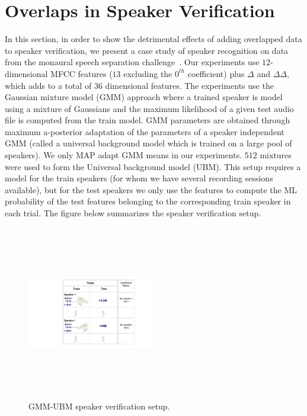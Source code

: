 \section{Overlaps in Speaker Verification}
\label{SID_in_GRID}

In this section, in order to show the detrimental effects of adding overlapped data to speaker verification, we present a case study of speaker recognition on data from the monaural speech separation challenge~\cite{cooke20101}. 
Our experiments use $12$-dimensional MFCC features ($13$ excluding the $0^{th}$ coefficient) plus $\Delta$ and $\Delta\Delta$, which adds to a total of 36 dimensional features. 
The experiments use the Gaussian mixture model (GMM) approach where a trained speaker is model using a mixture of Gaussians and the maximum likelihood of a given test audio file is computed from the train model. 
GMM parameters are obtained through maximum a-posterior adaptation of the parameters of a speaker independent GMM (called a universal background model which is trained on a large pool of speakers). 
We only MAP adapt GMM means in our experiments. 
$512$ mixtures were used to form the Universal background model (UBM). 
This setup requires a model for the train speakers (for whom we have several recording sessions available), but for the test speakers we only use the features to compute the ML probability of the test features belonging to the corresponding train speaker in each trial. 
The figure below summarizes the speaker verification setup. 

\begin{figure}[h!]
	\centering
	\vspace{0mm}
	\includegraphics[height = 3in, width=0.5\textwidth]{figures/speaker_verification_setup}
	\vspace{-3mm}
	\caption{GMM-UBM speaker verification setup.}
	\label{fig:gmm_ubm_verification}
	\vspace{-3mm}
\end{figure}


